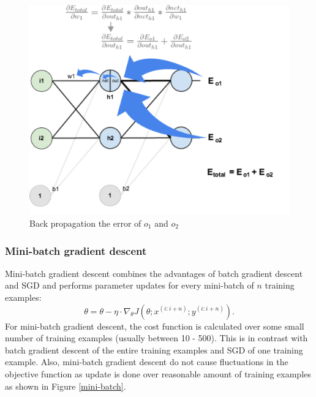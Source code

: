 \documentclass[master]{thesis-uestc}
\begin{document}
\begin{figure}[ht]
\includegraphics[width=5in]{pic/nn-calculation.png}
\caption{Back propagation the error of $o_1$ and $o_2$}
\label{fig_nn-calculation}
\end{figure}

\subsubsection{Mini-batch gradient descent}
Mini-batch gradient descent combines the advantages of batch gradient descent and SGD and performs parameter updates for every mini-batch of $n$ training examples:
\begin{equation}
    \theta = \theta - \eta \cdot \nabla_\theta J(\theta; x^{(i:i+n)}; y^{(i:i+n)}).
\end{equation}
For mini-batch gradient descent, the cost function is calculated over some small number of training examples (usually between 10 - 500). This is in contrast with batch gradient descent of the entire training examples and SGD of one training example. Also, mini-batch gradient descent do not cause fluctuations in the objective function as update is done over reasonable amount of training examples as shown in Figure \ref{mini-batch}.
\end{document}
